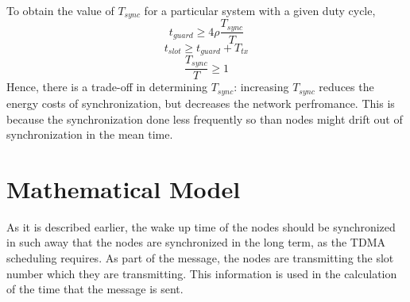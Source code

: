 \documentclass[a4paper,10pt]{report}
\begin{document}
\paragraph*{}
To obtain the value of $T_{sync}$ for a particular system with a given duty cycle,
\begin{equation}
t_{guard} \geq 4\rho \frac{T_{sync}}{T}
\end{equation}
\begin{equation}
t_{slot} \geq t_{guard} + T_{tx}
\end{equation}
\begin{equation}
\frac{T_{sync}}{T} \geq 1
\end{equation}
Hence, there is a trade-off in determining $T_{sync}$: increasing $T_{sync}$ reduces the energy costs of synchronization, but decreases the network perfromance. This is because the synchronization done less frequently so than nodes might drift out of synchronization in the mean time.
\section{\textbf{Mathematical Model}}
As it is described earlier, the wake up time of the nodes should be synchronized in such away that the nodes are synchronized in the
long term, as the TDMA scheduling requires. As part of the message, the nodes are transmitting the slot number which they are transmitting. This information is used in the calculation of the time that the message is sent.
\end{document}
